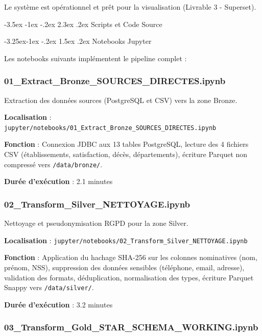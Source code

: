 \documentclass[12pt,a4paper]{article}
\makeatletter
\renewcommand\section{\@startsection{section}{1}{\z@}%
    {-3.5ex \@plus -1ex \@minus -.2ex}%
    {2.3ex \@plus.2ex}%
    {\normalfont\Large\bfseries\color{blue!70!black}}}
\renewcommand\subsection{\@startsection{subsection}{2}{\z@}%
    {-3.25ex\@plus -1ex \@minus -.2ex}%
    {1.5ex \@plus .2ex}%
    {\normalfont\large\bfseries\color{blue!50!black}}}
\makeatother
\begin{document}
Le système est opérationnel et prêt pour la visualisation (Livrable 3 - Superset).

\newpage
\appendix
\section{Scripts et Code Source}

\subsection{Notebooks Jupyter}

Les notebooks suivants implémentent le pipeline complet :

\subsubsection{01\_Extract\_Bronze\_SOURCES\_DIRECTES.ipynb}

Extraction des données sources (PostgreSQL et CSV) vers la zone Bronze.

\textbf{Localisation} : \texttt{jupyter/notebooks/01\_Extract\_Bronze\_SOURCES\_DIRECTES.ipynb}

\textbf{Fonction} : Connexion JDBC aux 13 tables PostgreSQL, lecture des 4 fichiers CSV (établissements, satisfaction, décès, départements), écriture Parquet non compressé vers \texttt{/data/bronze/}.

\textbf{Durée d'exécution} : 2.1 minutes

\subsubsection{02\_Transform\_Silver\_NETTOYAGE.ipynb}

Nettoyage et pseudonymisation RGPD pour la zone Silver.

\textbf{Localisation} : \texttt{jupyter/notebooks/02\_Transform\_Silver\_NETTOYAGE.ipynb}

\textbf{Fonction} : Application du hachage SHA-256 sur les colonnes nominatives (nom, prénom, NSS), suppression des données sensibles (téléphone, email, adresse), validation des formats, déduplication, normalisation des types, écriture Parquet Snappy vers \texttt{/data/silver/}.

\textbf{Durée d'exécution} : 3.2 minutes

\subsubsection{03\_Transform\_Gold\_STAR\_SCHEMA\_WORKING.ipynb}
\end{document}
